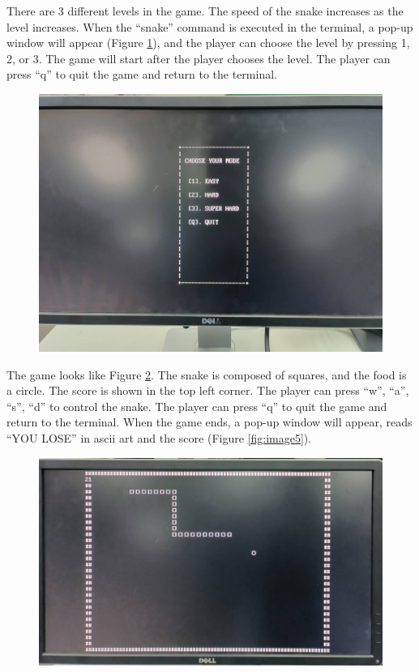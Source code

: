\documentclass[
	a4paper, %
	11pt, %
]{CSUniSchoolLabReport}
\begin{document}
There are 3 different levels in the game. The speed of the snake increases as the level increases. When the ``snake'' command is executed in the terminal, a pop-up window will appear (Figure \ref{fig:image3}), and the player can choose the level by pressing 1, 2, or 3. The game will start after the player chooses the level. The player can press ``q'' to quit the game and return to the terminal.

\begin{figure}[!htb]
    \centering
    \includegraphics[width=12cm]{image3.png}
    \label{fig:image3}
\end{figure}
The game looks like Figure \ref{fig:image4}. The snake is composed of squares, and the food is a circle. The score is shown in the top left corner. The player can press ``w'', ``a'', ``s'', ``d'' to control the snake. The player can press ``q'' to quit the game and return to the terminal. When the game ends, a pop-up window will appear, reads ``YOU LOSE'' in ascii art and the score (Figure \ref{fig:image5}).

\begin{figure}[!htb]
    \centering
    \includegraphics[width=12cm]{image4.png}
    \label{fig:image4}
\end{figure}
\end{document}
